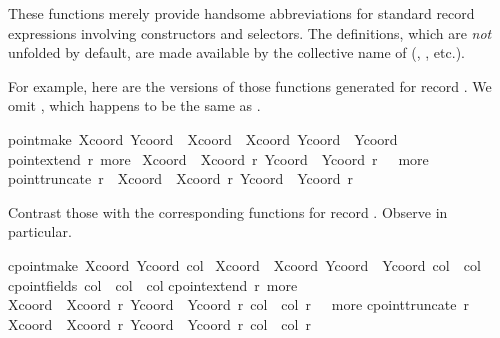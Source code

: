 \begin{isabellebody}
\begin{isamarkuptext}
\begin{itemize}
  \end{itemize}

  These functions merely provide handsome abbreviations for standard
  record expressions involving constructors and selectors.  The
  definitions, which are \emph{not} unfolded by default, are made
  available by the collective name of  (, , etc.).

  For example, here are the versions of those functions generated for
  record .  We omit , which happens to
  be the same as .

  \begin{isabelle}%
point{\isachardot}make\ Xcoord\ Ycoord\ {\isasymequiv}\ {\isasymlparr}Xcoord\ {\isacharequal}\ Xcoord{\isacharcomma}\ Ycoord\ {\isacharequal}\ Ycoord{\isasymrparr}\isanewline
point{\isachardot}extend\ r\ more\ {\isasymequiv}\isanewline
{\isasymlparr}Xcoord\ {\isacharequal}\ Xcoord\ r{\isacharcomma}\ Ycoord\ {\isacharequal}\ Ycoord\ r{\isacharcomma}\ {\isasymdots}\ {\isacharequal}\ more{\isasymrparr}\isanewline
point{\isachardot}truncate\ r\ {\isasymequiv}\ {\isasymlparr}Xcoord\ {\isacharequal}\ Xcoord\ r{\isacharcomma}\ Ycoord\ {\isacharequal}\ Ycoord\ r{\isasymrparr}%
\end{isabelle}

  Contrast those with the corresponding functions for record .  Observe  in particular.

  \begin{isabelle}%
cpoint{\isachardot}make\ Xcoord\ Ycoord\ col\ {\isasymequiv}\isanewline
{\isasymlparr}Xcoord\ {\isacharequal}\ Xcoord{\isacharcomma}\ Ycoord\ {\isacharequal}\ Ycoord{\isacharcomma}\ col\ {\isacharequal}\ col{\isasymrparr}\isanewline
cpoint{\isachardot}fields\ col\ {\isasymequiv}\ {\isasymlparr}col\ {\isacharequal}\ col{\isasymrparr}\isanewline
cpoint{\isachardot}extend\ r\ more\ {\isasymequiv}\isanewline
{\isasymlparr}Xcoord\ {\isacharequal}\ Xcoord\ r{\isacharcomma}\ Ycoord\ {\isacharequal}\ Ycoord\ r{\isacharcomma}\ col\ {\isacharequal}\ col\ r{\isacharcomma}\ {\isasymdots}\ {\isacharequal}\ more{\isasymrparr}\isanewline
cpoint{\isachardot}truncate\ r\ {\isasymequiv}\isanewline
{\isasymlparr}Xcoord\ {\isacharequal}\ Xcoord\ r{\isacharcomma}\ Ycoord\ {\isacharequal}\ Ycoord\ r{\isacharcomma}\ col\ {\isacharequal}\ col\ r{\isasymrparr}%
\end{isabelle}


\end{isamarkuptext}
\end{isabellebody}
